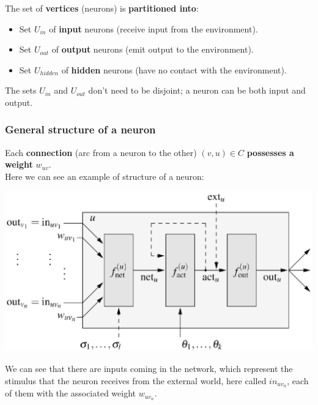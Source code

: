 \documentclass[11pt]{article}
\begin{document}
		The set of \textbf{vertices} (neurons) is \textbf{partitioned into}: 
		\begin{itemize}
			\item Set $U_{in}$ of \textbf{input} neurons (receive input from the environment).\\
			
			\item Set $U_{out}$ of \textbf{output} neurons (emit output to the environment).\\
			
			\item Set $U_{hidden}$ of \textbf{hidden} neurons (have no contact with the environment).\\
			
		\end{itemize}
		The sets $U_{in}$ and $U_{out}$ don't need to be disjoint; a neuron can be both input and output.\\


		
		\subsubsection{General structure of a neuron}
		Each \textbf{connection} (arc from a neuron to the other) $(v,u) \in C$ \textbf{possesses a weight} $w_{uv}$.\\
		
		Here we can see an example of structure of a neuron:
		\begin{center}
			\includegraphics[width=0.9\columnwidth]{img/NN/neuron1}
		\end{center}
		
		\newpage
		
		We can see that there are inputs coming in the network, which represent the stimulus that the neuron receives from the external world, here called $in_{uv_n}$, each of them with the associated weight $w_{uv_n}$.\\
		
\end{document}
